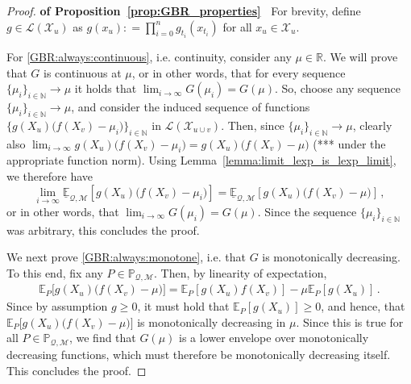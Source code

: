 \documentclass[twoside,11pt]{article}
\newcommand{\nats}{\mathbb{N}}
\newcommand{\reals}{\mathbb{R}}
\newcommand{\states}{\mathcal{X}}
\newcommand{\lexp}{\underline{\mathbb{E}}_{\rateset,\mathcal{M}}}
\newcommand{\gambles}{\mathcal{L}}
\newcommand{\rateset}{\mathcal{Q}}
\newcommand{\coloneqq}{:\!=}
\begin{document}
\begin{proof}{\bf of Proposition~\ref{prop:GBR_properties}~}
For brevity, define $g\in\gambles(\states_u)$ as $g(x_u)\coloneqq \prod_{i=0}^n g_{t_i}(x_{t_i})$ for all $x_u\in\states_u$.

For \ref{GBR:always:continuous}, i.e. continuity, consider any $\mu\in\reals$. We will prove that $G$ is continuous at $\mu$, or in other words, that for every sequence $\{\mu_i\}_{i\in\nats}\to\mu$ it holds that $\lim_{i\to\infty}G(\mu_i)=G(\mu)$. So, choose any sequence $\{\mu_i\}_{i\in\nats}\to\mu$, and consider the induced sequence of functions $\bigl\{g(X_u)\bigl(f(X_v) - \mu_i\bigr)\bigr\}_{i\in\nats}$ in $\gambles(\states_{u\cup v})$. Then, since $\{\mu_i\}_{i\in\nats}\to\mu$, clearly also $\lim_{i\to\infty}g(X_u)\bigl(f(X_v) - \mu_i\bigr)=g(X_u)\bigl(f(X_v) - \mu\bigr)$ (*** under the appropriate function norm). Using Lemma~\ref{lemma:limit_lexp_is_lexp_limit}, we therefore have
\begin{equation*}
\lim_{i\to\infty}\lexp[g(X_u)\bigl(f(X_v) - \mu_i\bigr)] = \lexp[g(X_u)\bigl(f(X_v) - \mu\bigr)]\,,
\end{equation*}
or in other words, that $\lim_{i\to\infty}G(\mu_i) = G(\mu)$. Since the sequence $\{\mu_i\}_{i\in\nats}$ was arbitrary, this concludes the proof.

We next prove \ref{GBR:always:monotone}, i.e. that $G$ is monotonically decreasing. To this end, fix any $P\in\mathbb{P}_{\rateset,\mathcal{M}}$. Then, by linearity of expectation,
\begin{align}\label{eq:gbr_linear_expansion}
\mathbb{E}_P\bigl[g(X_u)\bigl(f(X_v) - \mu\bigr)\bigr] = \mathbb{E}_P[g(X_u)f(X_v)] - \mu\mathbb{E}_P[g(X_u)]\,.
\end{align}
Since by assumption $g\geq 0$, it must hold that $\mathbb{E}_P[g(X_u)]\geq 0$, and hence, that $\mathbb{E}_P\bigl[g(X_u)\bigl(f(X_v) - \mu\bigr)\bigr]$ is monotonically decreasing in $\mu$. Since this is true for all $P\in\mathbb{P}_{\rateset,\mathcal{M}}$, we find that $G(\mu)$ is a lower envelope over monotonically decreasing functions, which must therefore be monotonically decreasing itself. This concludes the proof.


\end{proof}
\end{document}
